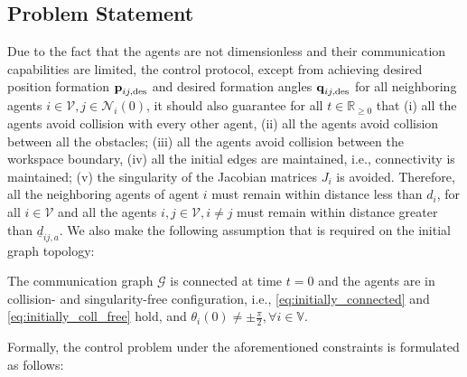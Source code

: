 \subsection{Problem Statement}

Due to the fact that the agents are not dimensionless and their communication
capabilities are limited, the control protocol, except from achieving desired
position formation $\bm{\mathbf{p}}_{ij, \text{des}}$ and desired formation angles
$\bm{\mathbf{q}}_{ij, \text{des}}$ for all neighboring agents
$i \in \mathcal{V}, j \in \mathcal{N}_i(0)$, it should also guarantee for
all $t\in\mathbb{R}_{\geq 0}$ that (i) all the agents avoid collision with
every other agent, (ii) all the agents avoid collision between all the
obstacles; (iii) all the agents avoid collision between the workspace boundary,
(iv) all the initial edges are maintained, i.e., connectivity is maintained;
(v) the singularity of the Jacobian matrices $J_i$ is avoided. Therefore,
all the neighboring agents of agent $i$ must remain within distance less than
$d_i$, for all $i \in \mathcal{V}$
and all the agents $i, j\in \mathcal{V}, i \neq j$ must remain within distance
greater than $\underline{d}_{ij,a}$. We also make the following assumption that
is required on the initial graph topology:

\begin{assumption}
	The communication graph $\mathcal{G}$ is connected at time $t = 0$ and the
  agents are in collision- and singularity-free configuration, i.e.,
  \eqref{eq:initially_connected} and \eqref{eq:initially_coll_free} hold,
  and $\theta_i(0) \neq \pm \frac{\pi}{2}, \forall i \in \mathbb{V}$.
\end{assumption}




























Formally, the control problem under the aforementioned constraints is
formulated as follows:

